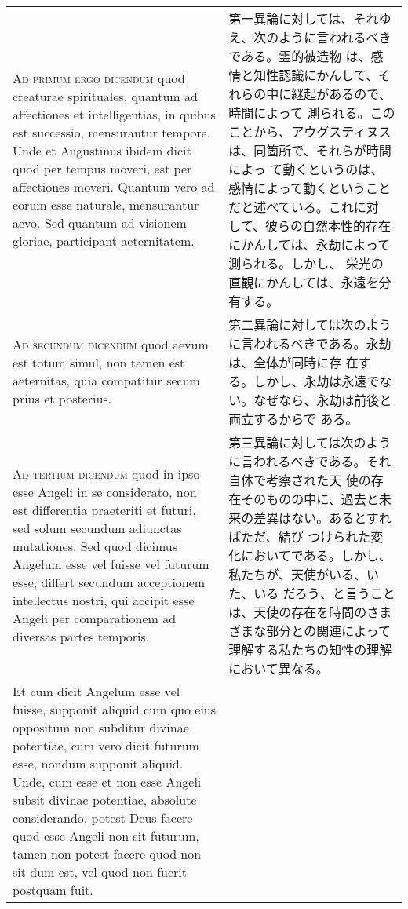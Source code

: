 \documentclass[10pt]{jsarticle} %
\begin{document}
\begin{longtable}{p{21em}p{21em}}
{\scshape Ad primum ergo dicendum} quod creaturae spirituales, quantum
 ad affectiones et intelligentias, in quibus est successio, mensurantur
 tempore. Unde et Augustinus ibidem dicit quod per tempus moveri, est
 per affectiones moveri. Quantum vero ad eorum esse naturale,
 mensurantur aevo. Sed quantum ad visionem gloriae, participant
 aeternitatem.

&

第一異論に対しては、それゆえ、次のように言われるべきである。霊的被造物
は、感情と知性認識にかんして、それらの中に継起があるので、時間によって
測られる。このことから、アウグスティヌスは、同箇所で、それらが時間によっ
て動くというのは、 感情によって動くということだと述べている。これに対
して、彼らの自然本性的存在にかんしては、永劫によって測られる。しかし、
栄光の直観にかんしては、永遠を分有する。


\\

{\scshape Ad secundum dicendum} quod aevum est totum simul, non tamen
 est aeternitas, quia compatitur secum prius et posterius.


&

第二異論に対しては次のように言われるべきである。永劫は、全体が同時に存
在する。しかし、永劫は永遠でない。なぜなら、永劫は前後と両立するからで
ある。

\\

{\scshape Ad tertium dicendum} quod in ipso esse Angeli in se
considerato, non est differentia praeteriti et futuri, sed solum
secundum adiunctas mutationes. Sed quod dicimus Angelum esse vel fuisse
vel futurum esse, differt secundum acceptionem intellectus nostri, qui
accipit esse Angeli per comparationem ad diversas partes temporis.


&


第三異論に対しては次のように言われるべきである。それ自体で考察された天
使の存在そのものの中に、過去と未来の差異はない。あるとすればただ、結び
つけられた変化においてである。しかし、私たちが、天使がいる、いた、いる
だろう、と言うことは、天使の存在を時間のさまざまな部分との関連によって
理解する私たちの知性の理解において異なる。

\\


Et cum dicit Angelum esse
vel fuisse, supponit aliquid cum quo eius oppositum non subditur divinae
potentiae, cum vero dicit futurum esse, nondum supponit aliquid. Unde,
cum esse et non esse Angeli subsit divinae potentiae, absolute
considerando, potest Deus facere quod esse Angeli non sit futurum, tamen
non potest facere quod non sit dum est, vel quod non fuerit postquam
fuit.


\end{longtable}
\end{document}
